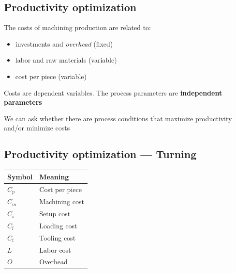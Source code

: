 \documentclass[
  letterpaper,
  DIV=11,
  numbers=noendperiod]{scrartcl}
\newcounter{none} %
\providecommand{\tightlist}{%
  \setlength{\itemsep}{0pt}\setlength{\parskip}{0pt}}
\begin{document}
\subsection{Productivity optimization}\label{productivity-optimization}

The costs of machining production are related to:

\begin{itemize}
\tightlist
\item
  investments and \emph{overhead} ({fixed})
\item
  labor and raw materials ({variable})
\item
  cost per piece ({variable})
\end{itemize}

Costs are dependent variables. The process parameters are
\textbf{independent parameters}

\begin{tcolorbox}[enhanced jigsaw, arc=.35mm, bottomrule=.15mm, bottomtitle=1mm, breakable, colback=white, colbacktitle=quarto-callout-important-color!10!white, colframe=quarto-callout-important-color-frame, coltitle=black, left=2mm, leftrule=.75mm, opacityback=0, opacitybacktitle=0.6, rightrule=.15mm, title=\textcolor{quarto-callout-important-color}{\faExclamation}\hspace{0.5em}{Important}, titlerule=0mm, toprule=.15mm, toptitle=1mm]

We can ask whether there are process conditions that {maximize}
productivity and/or {minimize} costs

\end{tcolorbox}

\subsection{Productivity optimization ---
Turning}\label{productivity-optimization-turning}

{\def\LTcaptype{none} %
\begin{longtable}[]{@{}ll@{}}
\toprule\noalign{}
Symbol & Meaning \\
\midrule\noalign{}
\endhead
\bottomrule\noalign{}
\endlastfoot
\(C_p\) & Cost per piece \\
\(C_m\) & Machining cost \\
\(C_s\) & Setup cost \\
\(C_l\) & Loading cost \\
\(C_t\) & Tooling cost \\
\(L\) & Labor cost \\
\(O\) & Overhead \\
\end{longtable}
}
\end{document}
